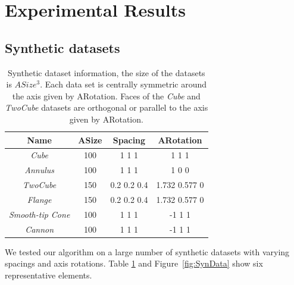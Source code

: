 \section{Experimental Results}
\subsection{Synthetic datasets}
\begin{table}[htb]
	\centering
	\begin{tabular}{|c c c c|} 
		\hline
		Name & ASize & Spacing & ARotation \\ [0.5ex] 
		\hline 
		\textit{Cube}  & 100 & 1 1 1 & 1 1 1\\
		\textit{Annulus} & 100 & 1 1 1 &  1 0 0\\ 
		\textit{TwoCube} & 150 & 0.2 0.2 0.4 &  1.732 0.577 0\\ 
		\textit{Flange} & 150 & 0.2 0.2 0.4 &  1.732 0.577 0\\ 
        \textit{Smooth-tip Cone} & 100 & 1 1 1 &  -1 1 1\\ 
        \textit{Cannon} & 100 & 1 1 1 &  -1 1 1\\ 
		\hline
	\end{tabular}

\caption{Synthetic dataset information, the size of the datasets is $ASize^3$. 
Each data set is centrally symmetric around the axis given by ARotation.
Faces of the \emph{Cube} and \emph{TwoCube} datasets are
orthogonal or parallel to the axis given by ARotation.}

	\label{table:SynDataInfo}
\end{table}
We tested our algorithm on a large number of synthetic datasets with varying spacings and axis rotations. 
Table \ref{table:SynDataInfo} and Figure~\ref{fig:SynData} show
six representative elements.

